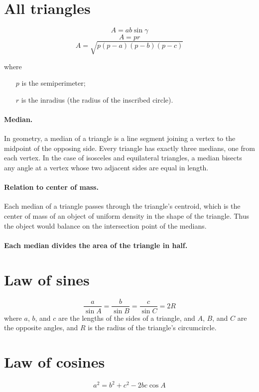 \documentclass[12pt, oneside]{book}
\begin{document}
\section{All triangles}
\[A = a b \sin \gamma \]
\[A = p r\]
\[A = \sqrt{p \left ( p - a \right ) \left ( p - b \right ) \left ( p - c
\right )}\]

where

\begin{itemize}
  \item[\(p\)] is the semiperimeter;
  \item[\(r\)] is the inradius (the radius of the inscribed circle).
\end{itemize}

\paragraph{Median.} In geometry, a median of a triangle is a line segment
joining a vertex to the midpoint of the opposing side. Every triangle has
exactly three medians, one from each vertex. In the case of isosceles and
equilateral triangles, a median bisects any angle at a vertex whose two adjacent
sides are equal in length.

\paragraph{Relation to center of mass.} Each median of a triangle passes through
the triangle's centroid, which is the center of mass of an object of uniform
density in the shape of the triangle. Thus the object would balance on the
intersection point of the medians.

\paragraph{Each median divides the area of the triangle in half.}

\section{Law of sines}
\[\frac{a}{\sin{A}} = \frac{b}{\sin{B}} = \frac{c}{\sin{C}} = 2R\]
where \(a\), \(b\), and \(c\) are the lengths of the sides of a triangle, and
\(A\), \(B\), and \(C\) are the opposite angles, and \(R\) is the radius of
the triangle's circumcircle.

\section{Law of cosines}
\[a^2 = b^2 + c^2 - 2bc\cos{A}\]
\end{document}
